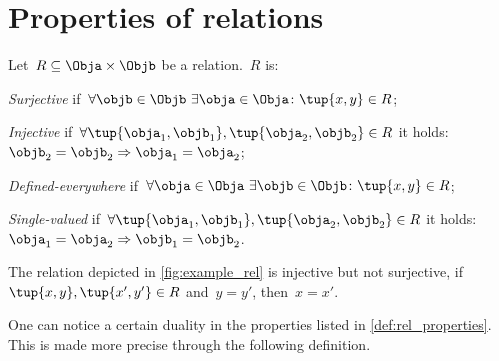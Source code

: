 

\section{Properties of relations}


\begin{definition}
  \label{def:rel_properties}
  Let~$R\subseteq \Obja \times \Objb$ be a relation.~$R$ is:
  \begin{compactenum}
    \item \emph{Surjective} if~$\forall \objb\in \Objb \ \exists \obja\in \Obja\colon \tup{x,y}\in R$;
    \item \emph{Injective} if~$\forall \tup{\obja_1,\objb_1},\tup{\obja_2,\objb_2}\in R$ it holds:~$\objb_2=\objb_2 \Rightarrow \obja_1=\obja_2$;
    \item \emph{Defined-everywhere} if~$\forall \obja\in \Obja \ \exists \objb \in \Objb\colon \tup{x,y}\in R$;
    \item \emph{Single-valued} if~$\forall \tup{\obja_1,\objb_1},\tup{\obja_2,\objb_2}\in R$ it holds:~$\obja_1=\obja_2\Rightarrow \objb_1=\objb_2$.
  \end{compactenum}
\end{definition}

\begin{example}
  The relation depicted in \cref{fig:example_rel} is injective but not surjective, \ie  if~$\tup{x,y},\tup{x',y'}\in R$ and~$y=y'$, then~$x=x'$.
\end{example}

One can notice a certain duality in the properties listed in \cref{def:rel_properties}. This is made more precise through the following definition.


